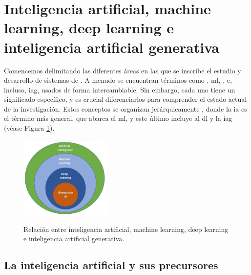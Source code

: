 
\section{Inteligencia artificial, machine learning, deep learning e inteligencia artificial generativa}

Comencemos delimitando las diferentes áreas en las que se inscribe el estudio y desarrollo de sistemas de . A menudo se encuentran términos como , \gls{ml},  , e, incluso, \gls{iag}, usados de forma intercambiable. Sin embargo, cada uno tiene un significado específico, y es crucial diferenciarlos para comprender el estado actual de la investigación. Estos conceptos se organizan jerárquicamente \citep{torresivinalsPythonDeepLearning2020}, donde la \gls{ia} es el término más general, que abarca el \gls{ml}, y este último incluye al \gls{dl} y la \gls{iag} (véase Figura \ref{fig:ai_ml_dl_gai}).

\begin{figure}[H]
    \caption{Relación entre inteligencia artificial, {machine learning}, {deep learning} e inteligencia artificial generativa.}
    \centering
    \includegraphics[width=0.4\textwidth]{./figuras/ai_ml_dl_gai.png}
    \label{fig:ai_ml_dl_gai}
\end{figure}



\subsection{La inteligencia artificial y sus precursores}

